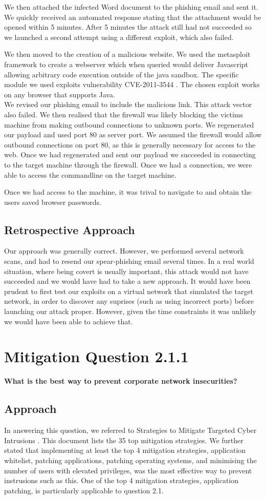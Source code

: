 We then attached the infected Word document to the phishing email and sent it. We quickly received an automated response stating that the attachment would be opened within 5 minutes. After 5 minutes the attack still had not succeeded so we launched a second attempt using a different exploit, which also failed.

We then moved to the creation of a malicious website. We used the metasploit framework to create a webserver which when queried would deliver Javascript allowing arbitrary code execution outside of the java sandbox. The specific module we used exploits vulnerability CVE-2011-3544 \cite{CVE-2011-3544}. The chosen exploit works on any browser that supports Java.\\
We revised our phishing email to include the malicious link. This attack vector also failed. We then realised that the firewall was likely blocking the victims machine from making outbound connections to unknown ports. We regenerated our payload and used port 80 as server port. We assumed the firewall would allow outbound connections on port 80, as this is generally necessary for access to the web. Once we had regenerated and sent our payload we succeeded in connecting to the target machine through the firewall. Once we had a connection, we were able to access the commandline on the target machine.

Once we had access to the machine, it was trival to navigate to and obtain the users saved browser passwords.
\subsection{Retrospective Approach}
Our approach was generally correct. However, we performed several network scans, and had to resend our spear-phishing email several times. In a real world situation, where being covert is usually important, this attack would not have succeeded and we would have had to take a new approach. It would have been prudent to first test our exploits on a virtual network that simulated the target network, in order to discover any suprises (such as using incorrect ports) before launching our attack proper. However, given the time constraints it was unlikely we would have been able to achieve that. 
\section{Mitigation Question 2.1.1}
\textbf{What is the best way to prevent corporate network insecurities?}
\subsection{Approach}
In answering this question, we referred to Strategies to Mitigate Targeted Cyber Intrusions \cite{dsd}. This document lists the 35 top mitigation strategies. We further stated that implementing at least the top 4 mitigation strategies, application whitelist, patching applications, patching operating systems, and minimising the number of users with elevated privileges, was the most effective way to prevent instrusions such as this. One of the top 4 mitigation strategies, application patching, is particularly applicable to question 2.1. 
